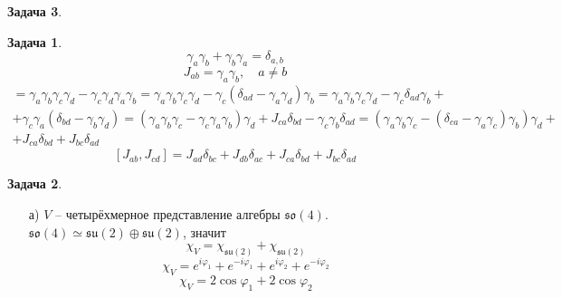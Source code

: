\documentclass[12pt]{article}
\theoremstyle{definition}
\newtheorem{zad}{Задача}[section]
\begin{document}
\begin{zad}
\begin{itemize}
\begin{zad}
    \begin{equation}
        \gamma_a\gamma_b+\gamma_b\gamma_a=\delta_{a,b}
    \end{equation}
    \begin{equation}
        J_{ab}=\gamma_a\gamma_b,\quad a\neq b
    \end{equation}
    \begin{multline}
        [J_{ab},J_{cd}]=\gamma_a\gamma_b\gamma_c\gamma_d-\gamma_c\gamma_d\gamma_a\gamma_b=\gamma_a\gamma_b\gamma_c\gamma_d-\gamma_c(\delta_{ad}-\gamma_a\gamma_d)\gamma_b=\gamma_a\gamma_b\gamma_c\gamma_d-\gamma_c\delta_{ad}\gamma_b+\\+\gamma_c\gamma_a(\delta_{bd}-\gamma_b\gamma_d)=(\gamma_a\gamma_b\gamma_c-\gamma_c\gamma_a\gamma_b)\gamma_d+J_{ca}\delta_{bd}-\gamma_c\gamma_b\delta_{ad}=(\gamma_a\gamma_b\gamma_c-(\delta_{ca}-\gamma_a\gamma_c)\gamma_b)\gamma_d+\\+J_{ca}\delta_{bd}+J_{bc}\delta_{ad}
    \end{multline}
    \begin{equation}
        \boxed{[J_{ab},J_{cd}]=J_{ad}\delta_{bc}+J_{db}\delta_{ac}+J_{ca}\delta_{bd}+J_{bc}\delta_{ad}}
    \end{equation}
    \end{zad}
    \begin{zad}
    \begin{itemize}
        \item[а)] $V$ -- четырёхмерное представление алгебры $\mathfrak{so}(4)$. $\mathfrak{so}(4)\simeq \mathfrak{su}(2)\oplus\mathfrak{su}(2)$, значит
        \begin{equation}
            \chi_V=\chi_{\mathfrak{su}(2)}+\chi_{\mathfrak{su}(2)}
        \end{equation}
        \begin{equation}
            \chi_V=e^{i\varphi_1}+e^{-i\varphi_1}+e^{i\varphi_2}+e^{-i\varphi_2}
        \end{equation}
        \begin{equation}
            \boxed{\chi_V=2\cos\varphi_1+2\cos\varphi_2}
        \end{equation}
    \end{itemize}
    \end{zad}
\end{itemize}
\end{zad}
\end{document}
